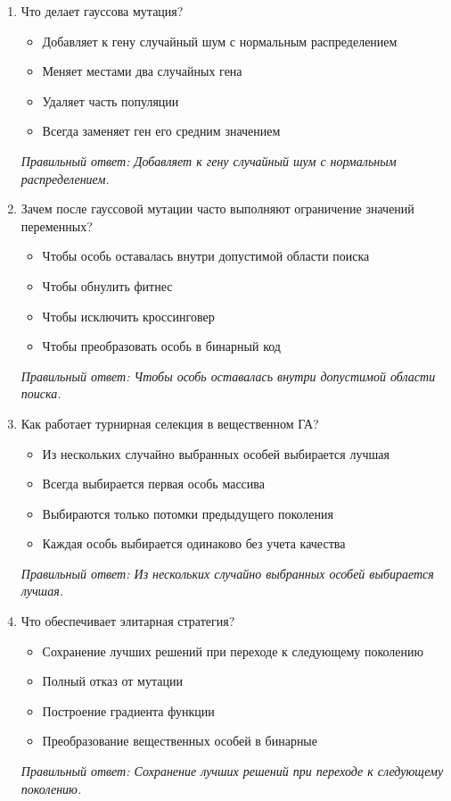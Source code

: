 \begin{enumerate}[label=\textbf{\arabic*.}, leftmargin=0pt, itemsep=1.2em]
\item Что делает гауссова мутация?
\begin{itemize}[label=$\square$, leftmargin=1.5cm, itemsep=0.2em, topsep=0.3em]
\item Добавляет к гену случайный шум с нормальным распределением
\item Меняет местами два случайных гена
\item Удаляет часть популяции
\item Всегда заменяет ген его средним значением
\end{itemize}
{\small\textit{Правильный ответ: Добавляет к гену случайный шум с нормальным распределением.}}

\item Зачем после гауссовой мутации часто выполняют ограничение значений переменных?
\begin{itemize}[label=$\square$, leftmargin=1.5cm, itemsep=0.2em, topsep=0.3em]
\item Чтобы особь оставалась внутри допустимой области поиска
\item Чтобы обнулить фитнес
\item Чтобы исключить кроссинговер
\item Чтобы преобразовать особь в бинарный код
\end{itemize}
{\small\textit{Правильный ответ: Чтобы особь оставалась внутри допустимой области поиска.}}

\item Как работает турнирная селекция в вещественном ГА?
\begin{itemize}[label=$\square$, leftmargin=1.5cm, itemsep=0.2em, topsep=0.3em]
\item Из нескольких случайно выбранных особей выбирается лучшая
\item Всегда выбирается первая особь массива
\item Выбираются только потомки предыдущего поколения
\item Каждая особь выбирается одинаково без учета качества
\end{itemize}
{\small\textit{Правильный ответ: Из нескольких случайно выбранных особей выбирается лучшая.}}

\item Что обеспечивает элитарная стратегия?
\begin{itemize}[label=$\square$, leftmargin=1.5cm, itemsep=0.2em, topsep=0.3em]
\item Сохранение лучших решений при переходе к следующему поколению
\item Полный отказ от мутации
\item Построение градиента функции
\item Преобразование вещественных особей в бинарные
\end{itemize}
{\small\textit{Правильный ответ: Сохранение лучших решений при переходе к следующему поколению.}}


\end{enumerate}

